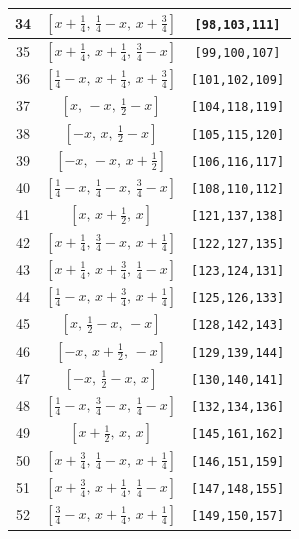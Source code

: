 \documentclass[fleqn,8pt]{jsarticle}
\begin{document}
\begin{longtable}{ccc}
34 & $\left[ x + \frac{1}{4},\, \frac{1}{4} - x,\, x + \frac{3}{4} \right]$ & {\tt [98,103,111]} \\ \hline
35 & $\left[ x + \frac{1}{4},\, x + \frac{1}{4},\, \frac{3}{4} - x \right]$ & {\tt [99,100,107]} \\ \hline
36 & $\left[ \frac{1}{4} - x,\, x + \frac{1}{4},\, x + \frac{3}{4} \right]$ & {\tt [101,102,109]} \\ \hline
37 & $\left[ x,\, - x,\, \frac{1}{2} - x \right]$ & {\tt [104,118,119]} \\ \hline
38 & $\left[ - x,\, x,\, \frac{1}{2} - x \right]$ & {\tt [105,115,120]} \\ \hline
39 & $\left[ - x,\, - x,\, x + \frac{1}{2} \right]$ & {\tt [106,116,117]} \\ \hline
40 & $\left[ \frac{1}{4} - x,\, \frac{1}{4} - x,\, \frac{3}{4} - x \right]$ & {\tt [108,110,112]} \\ \hline
41 & $\left[ x,\, x + \frac{1}{2},\, x \right]$ & {\tt [121,137,138]} \\ \hline
42 & $\left[ x + \frac{1}{4},\, \frac{3}{4} - x,\, x + \frac{1}{4} \right]$ & {\tt [122,127,135]} \\ \hline
43 & $\left[ x + \frac{1}{4},\, x + \frac{3}{4},\, \frac{1}{4} - x \right]$ & {\tt [123,124,131]} \\ \hline
44 & $\left[ \frac{1}{4} - x,\, x + \frac{3}{4},\, x + \frac{1}{4} \right]$ & {\tt [125,126,133]} \\ \hline
45 & $\left[ x,\, \frac{1}{2} - x,\, - x \right]$ & {\tt [128,142,143]} \\ \hline
46 & $\left[ - x,\, x + \frac{1}{2},\, - x \right]$ & {\tt [129,139,144]} \\ \hline
47 & $\left[ - x,\, \frac{1}{2} - x,\, x \right]$ & {\tt [130,140,141]} \\ \hline
48 & $\left[ \frac{1}{4} - x,\, \frac{3}{4} - x,\, \frac{1}{4} - x \right]$ & {\tt [132,134,136]} \\ \hline
49 & $\left[ x + \frac{1}{2},\, x,\, x \right]$ & {\tt [145,161,162]} \\ \hline
50 & $\left[ x + \frac{3}{4},\, \frac{1}{4} - x,\, x + \frac{1}{4} \right]$ & {\tt [146,151,159]} \\ \hline
51 & $\left[ x + \frac{3}{4},\, x + \frac{1}{4},\, \frac{1}{4} - x \right]$ & {\tt [147,148,155]} \\ \hline
52 & $\left[ \frac{3}{4} - x,\, x + \frac{1}{4},\, x + \frac{1}{4} \right]$ & {\tt [149,150,157]} \\ \hline

\end{longtable}
\end{document}
